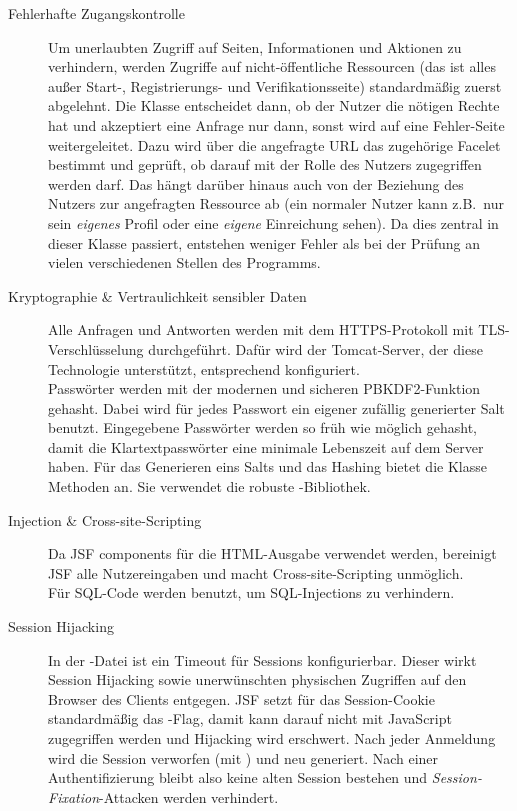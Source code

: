 \begin{description}
\item[Fehlerhafte Zugangskontrolle] 
Um unerlaubten Zugriff auf Seiten, Informationen und Aktionen zu verhindern, werden Zugriffe auf nicht-öffentliche Ressourcen (das ist alles außer Start-, Registrierungs- und Verifikationsseite) standardmäßig zuerst abgelehnt.
Die Klasse  entscheidet dann, ob der Nutzer die nötigen Rechte hat und akzeptiert eine Anfrage nur dann, sonst wird auf eine Fehler-Seite weitergeleitet.
Dazu wird über die angefragte URL das zugehörige Facelet bestimmt und geprüft, ob darauf mit der Rolle des Nutzers zugegriffen werden darf.
Das hängt darüber hinaus auch von der Beziehung des Nutzers zur angefragten Ressource ab (ein normaler Nutzer kann z.B.\ nur sein \emph{eigenes} Profil oder eine \emph{eigene} Einreichung sehen).
Da dies zentral in dieser Klasse passiert, entstehen weniger Fehler als bei der Prüfung an vielen verschiedenen Stellen des Programms.

\item[Kryptographie \& Vertraulichkeit sensibler Daten]
Alle Anfragen und Antworten werden mit dem HTTPS-Protokoll mit TLS-Verschlüsselung durchgeführt.
Dafür wird der Tomcat-Server, der diese Technologie unterstützt, entsprechend konfiguriert.
\\
Passwörter werden mit der modernen und sicheren PBKDF2-Funktion gehasht. Dabei wird für jedes Passwort ein eigener zufällig generierter Salt benutzt.
Eingegebene Passwörter werden so früh wie möglich gehasht, damit die Klartextpasswörter eine minimale Lebenszeit auf dem Server haben.
Für das Generieren eins Salts und das Hashing bietet die Klasse  Methoden an.
Sie verwendet die robuste -Bibliothek.

\item[Injection \& Cross-site-Scripting]
Da JSF components für die HTML-Ausgabe verwendet werden, bereinigt JSF alle Nutzereingaben und macht Cross-site-Scripting unmöglich.
\\
Für SQL-Code werden  benutzt, um SQL-Injections zu verhindern.

\item[Session Hijacking]
In der -Datei ist ein Timeout für Sessions konfigurierbar.
Dieser wirkt Session Hijacking sowie unerwünschten physischen Zugriffen auf den Browser des Clients entgegen.
JSF setzt für das Session-Cookie standardmäßig das -Flag, damit kann darauf nicht mit JavaScript zugegriffen werden und Hijacking wird erschwert.
Nach jeder Anmeldung wird die Session verworfen (mit ) und neu generiert.
Nach einer Authentifizierung bleibt also keine alten Session bestehen und \emph{Session-Fixation}-Attacken werden verhindert.


\end{description}

